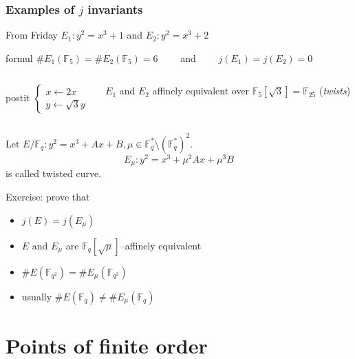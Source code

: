 \documentclass[10pt,handout]{beamer} %
\newcommand{\F}{\mathbb F}
\theoremstyle{definition}
\begin{document}
\begin{frame}
\frametitle{Examples of $j$ invariants}

From Friday \alert{$E_1: y^2=x^3+1$} and \alert{$E_2: y^2=x^3+2$}\pause

\begin{beamercolorbox}[shadow=true,center,rounded=true,wd=9cm]{formul}
$\#E_1(\F_5)=\#E_2(\F_5)=6\qquad$ and $\qquad j(E_1)=j(E_2)=0$
\end{beamercolorbox}

\begin{columns}
\begin{column}{4cm}
\begin{beamercolorbox}[shadow=true,center,rounded=true,wd=2.5cm]{postit}
        $\begin{cases}
x\longleftarrow 2x\\
y\longleftarrow \sqrt{3}y
  \end{cases}$\end{beamercolorbox}
 \end{column}
 \begin{column}{5cm}
$E_1$ and $E_2$ affinely equivalent over $\F_5[\sqrt{3}]=\F_{25}$ (\emph{twists})
 \end{column}
 \end{columns}\pause

\begin{definition} Let $E/\F_q: y^2=x^3+Ax+B, \mu\in\F_q^*\setminus(\F_q^*)^2$.
$$E_\mu: y^2=x^3+\mu^2Ax+\mu^3B$$ is called \alert{twisted curve.}
\end{definition}\pause

\begin{beamerboxesrounded}[upper=block title example,lower=block body alerted,shadow=true]{Exercise: prove that}
\begin{itemize}[<+-| alert@+>]
  \item $j(E)=j(E_\mu)$
  \item $E$ and $E_\mu$ are $\F_q[\sqrt{\mu}]$--affinely equivalent
  \item $\#E(\F_{q^2})=\#E_\mu(\F_{q^2})$
  \item usually $\#E(\F_{q})\neq\#E_\mu(\F_{q})$
\end{itemize}
\end{beamerboxesrounded}
\end{frame}


\section{Points of finite order}
\end{document}
